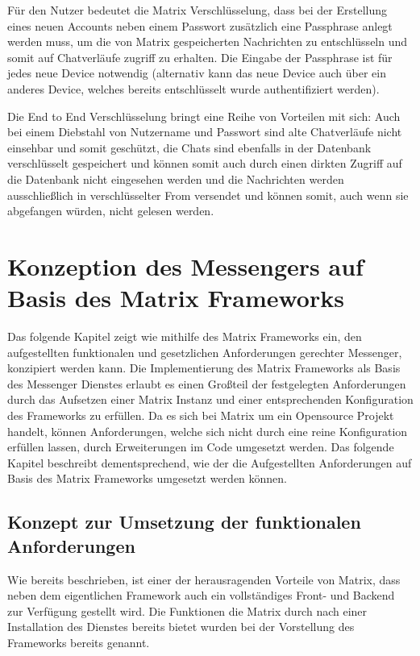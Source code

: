 Für den Nutzer bedeutet die Matrix Verschlüsselung, dass bei der Erstellung eines neuen Accounts neben einem Passwort zusätzlich eine Passphrase anlegt werden muss, um die von Matrix gespeicherten Nachrichten zu entschlüsseln und somit auf Chatverläufe zugriff zu erhalten.
Die Eingabe der Passphrase ist für jedes neue Device notwendig (alternativ kann das neue Device auch über ein anderes Device, welches bereits entschlüsselt wurde authentifiziert werden).

Die End to End Verschlüsselung bringt eine Reihe von Vorteilen mit sich: Auch bei einem Diebstahl von Nutzername und Passwort sind alte Chatverläufe nicht einsehbar und somit geschützt, die Chats sind ebenfalls in der Datenbank verschlüsselt gespeichert und können somit auch durch einen dirkten Zugriff auf die Datenbank nicht eingesehen werden und die Nachrichten werden ausschließlich in verschlüsselter From versendet und können somit, auch wenn sie abgefangen würden, nicht gelesen werden.

\section{Konzeption des Messengers auf Basis des Matrix Frameworks}\label{chapter:km}
Das folgende Kapitel zeigt wie mithilfe des Matrix Frameworks ein, den aufgestellten funktionalen und gesetzlichen Anforderungen gerechter Messenger, konzipiert werden kann.
Die Implementierung des Matrix Frameworks als Basis des Messenger Dienstes erlaubt es einen Großteil der festgelegten Anforderungen durch das Aufsetzen einer Matrix Instanz und einer entsprechenden Konfiguration des Frameworks zu erfüllen. Da es sich bei Matrix um ein Opensource Projekt handelt, können Anforderungen, welche sich nicht durch eine reine Konfiguration erfüllen lassen, durch Erweiterungen im Code umgesetzt werden. Das folgende Kapitel beschreibt dementsprechend, wie der die Aufgestellten Anforderungen auf Basis des Matrix Frameworks umgesetzt werden können.

\subsection{Konzept zur Umsetzung der funktionalen Anforderungen}\label{chapter:am}
Wie bereits beschrieben, ist einer der herausragenden Vorteile von Matrix, dass neben dem eigentlichen Framework auch ein vollständiges Front- und Backend zur Verfügung gestellt wird. Die Funktionen die Matrix durch nach einer Installation des Dienstes bereits bietet wurden bei der Vorstellung des Frameworks bereits genannt.

